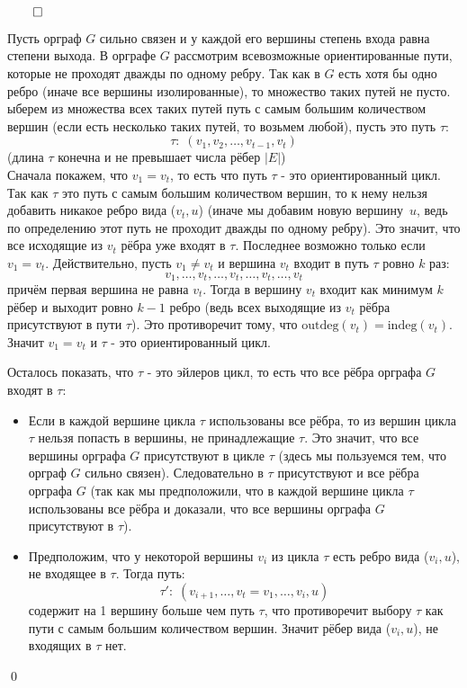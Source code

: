 \documentclass[a4paper,12pt,leqno]{article}
\theoremstyle{plain} %
\theoremstyle{definition} %
\renewenvironment{proof}{$\qed$}{{\qed}} %
\begin{document}
\begin{proof}
\begin{itemize}
    Пусть орграф $G$ сильно связен и у каждой его вершины степень входа равна степени выхода. В орграфе $G$ рассмотрим всевозможные ориентированные пути, которые не проходят дважды по одному ребру. Так как в $G$ есть хотя бы одно ребро (иначе все вершины изолированные), то множество таких путей не пусто. ыберем из множества всех таких путей путь с самым большим количеством вершин (если есть несколько таких путей, то возьмем любой), пусть это путь $\tau$:
    \[
    \tau: \; (v_1, v_2, \ldots, v_{t-1}, v_t)
    \]
    (длина $\tau$ конечна и не превышает числа рёбер $|E|$) \\
    Сначала покажем, что $v_1=v_t$, то есть что путь $\tau$ - это ориентированный цикл. Так как $\tau$ это путь с самым большим количеством вершин, то к нему нельзя добавить никакое ребро вида ($v_t, u$) (иначе мы добавим новую вершину~$u$, ведь по определению этот путь не проходит дважды по одному ребру). Это значит, что все исходящие из $v_t$ рёбра уже входят в $\tau$. Последнее возможно только если $v_1=v_t$. Действительно, пусть $v_1 \not= v_t$ и вершина $v_t$ входит в путь $\tau$ ровно $k$ раз:
    \[
    v_1, \ldots, v_t, \ldots, v_t, \ldots, v_t, \ldots, v_t
    \]
    причём первая вершина не равна $v_t$. Тогда в вершину $v_t$ входит как минимум $k$ рёбер и выходит ровно $k - 1$ ребро (ведь всех выходящие из $v_t$ рёбра присутствуют в пути $\tau$). Это противоречит тому, что $\mathrm{outdeg}(v_t) = \mathrm{indeg}(v_t)$. Значит $v_1 = v_t$ и $\tau$ - это ориентированный цикл.
    
    Осталось показать, что $\tau$ - это эйлеров цикл, то есть что все рёбра орграфа $G$ входят в $\tau$:
    
    \begin{itemize}
        \item Если в каждой вершине цикла $\tau$ использованы все рёбра, то из вершин цикла $\tau$ нельзя попасть в вершины, не принадлежащие $\tau$. Это значит, что все вершины орграфа $G$ присутствуют в цикле $\tau$ (здесь мы пользуемся тем, что орграф $G$ сильно связен). Следовательно в $\tau$ присутствуют и все рёбра орграфа $G$ (так как мы предположили, что в каждой вершине цикла $\tau$ использованы все рёбра и доказали, что все вершины орграфа $G$ присутствуют в $\tau$). 
    
    \item Предположим, что у некоторой вершины $v_i$ из цикла $\tau$ есть ребро вида ($v_i, u$), не     входящее в $\tau$. Тогда путь:
    \[
    \tau': \; (v_{i+1}, \ldots, v_t=v_1, \ldots, v_i, u)
    \]
    содержит на 1 вершину больше чем путь $\tau$, что противоречит выбору $\tau$ как пути с самым большим количеством вершин. Значит рёбер вида ($v_i, u$), не входящих в $\tau$ нет.
    

\end{itemize}
\end{itemize}
\end{proof}
\end{document}
